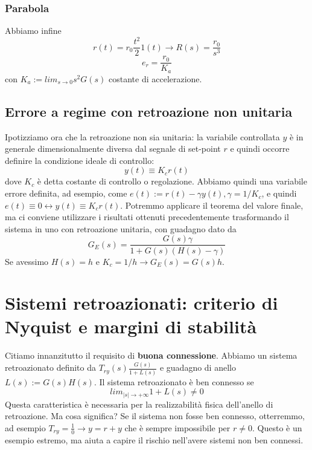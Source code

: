 \documentclass[11pt]{article}
\begin{document}
\subsubsection{Parabola}
Abbiamo infine
\begin{displaymath}
    r(t) = r_0 \frac{t^2}{2}1(t) \rightarrow R(s)=\frac{r_0}{s^3}
\end{displaymath}
\begin{displaymath}
    e_r = \frac{r_0}{K_a}
\end{displaymath}
con $K_a := lim_{s\rightarrow0} s^2G(s)$ costante di accelerazione.
\subsection{Errore a regime con retroazione non unitaria}
Ipotizziamo ora che la retroazione non sia unitaria: la variabile controllata $y$ è in generale dimensionalmente diversa dal segnale di set-point $r$ e quindi occorre definire la condizione ideale di controllo:
\begin{displaymath}
    y(t) \equiv K_c r(t)
\end{displaymath}
dove $K_c$ è detta costante di controllo o regolazione. Abbiamo quindi una variabile errore definita, ad esempio, come $e(t):=r(t) - \gamma y(t), \gamma=1/K_c$, e quindi $e(t) \equiv 0 \leftrightarrow y(t) \equiv K_cr(t)$.
Potremmo applicare il teorema del valore finale, ma ci conviene utilizzare i risultati ottenuti precedentemente trasformando il sistema in uno con retroazione unitaria, con guadagno dato da
\begin{displaymath}
    G_E(s) = \frac{G(s)\gamma}{1+G(s)(H(s)-\gamma)}
\end{displaymath}
Se avessimo $H(s) = h$ e $K_c = 1/h \rightarrow G_E(s) = G(s)h$.
\section{Sistemi retroazionati: criterio di Nyquist e margini di stabilità}
Citiamo innanzitutto il requisito di \textbf{buona connessione}. Abbiamo un sistema retroazionato definito da $T_{ry}(s)\frac{G(s)}{1+L(s)}$ e guadagno di anello $L(s):=G(s)H(s)$. Il sistema retroazionato è ben connesso se
\begin{displaymath}
    lim_{|s|\rightarrow+\infty} 1+L(s) \neq 0
\end{displaymath}
Questa caratteristica è necessaria per la realizzabilità fisica dell'anello di retroazione. Ma cosa significa? Se il sistema non fosse ben connesso, otterremmo, ad esempio $T_{ry}=\frac{1}{0}\rightarrow y=r+y$ che è sempre impossibile per $r\neq 0$. Questo è un esempio estremo, ma aiuta a capire il rischio nell'avere sistemi non ben connessi.
\end{document}
